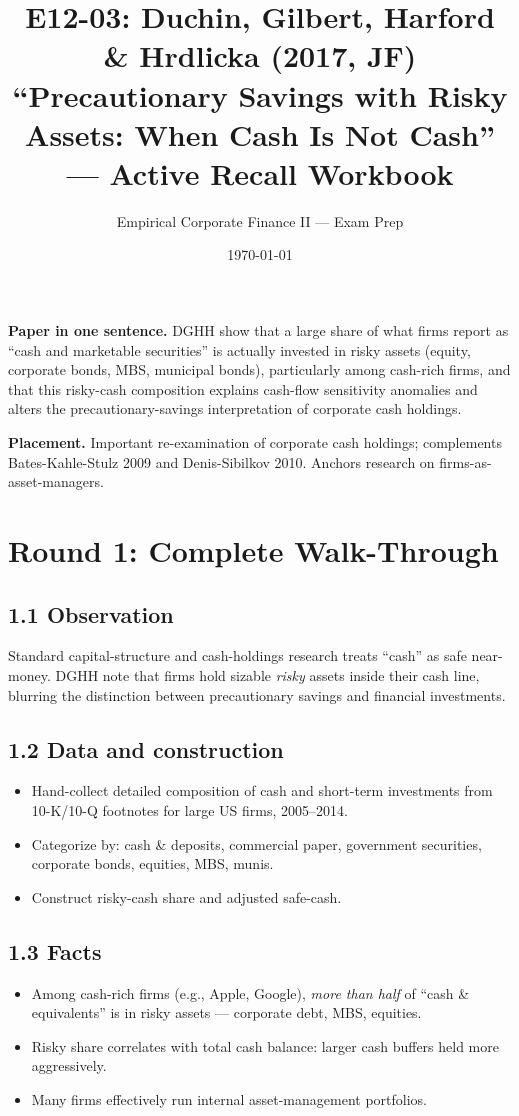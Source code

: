 \documentclass[11pt]{article}
\title{E12-03: Duchin, Gilbert, Harford \& Hrdlicka (2017, JF) \\
\large ``Precautionary Savings with Risky Assets: When Cash Is Not Cash'' --- Active Recall Workbook}
\author{Empirical Corporate Finance II --- Exam Prep}
\date{\today}
\begin{document}
\maketitle

\begin{keybox}
\textbf{Paper in one sentence.} DGHH show that a large share of what firms report as ``cash and marketable securities'' is actually invested in risky assets (equity, corporate bonds, MBS, municipal bonds), particularly among cash-rich firms, and that this risky-cash composition explains cash-flow sensitivity anomalies and alters the precautionary-savings interpretation of corporate cash holdings.

\textbf{Placement.} Important re-examination of corporate cash holdings; complements Bates-Kahle-Stulz 2009 and Denis-Sibilkov 2010. Anchors research on firms-as-asset-managers.
\end{keybox}

\section*{Round 1: Complete Walk-Through}

\subsection*{1.1 Observation}
Standard capital-structure and cash-holdings research treats ``cash'' as safe near-money. DGHH note that firms hold sizable \emph{risky} assets inside their cash line, blurring the distinction between precautionary savings and financial investments.

\subsection*{1.2 Data and construction}
\begin{itemize}
\item Hand-collect detailed composition of cash and short-term investments from 10-K/10-Q footnotes for large US firms, 2005--2014.
\item Categorize by: cash \& deposits, commercial paper, government securities, corporate bonds, equities, MBS, munis.
\item Construct risky-cash share and adjusted safe-cash.
\end{itemize}

\subsection*{1.3 Facts}
\begin{itemize}
\item Among cash-rich firms (e.g., Apple, Google), \emph{more than half} of ``cash \& equivalents'' is in risky assets --- corporate debt, MBS, equities.
\item Risky share correlates with total cash balance: larger cash buffers held more aggressively.
\item Many firms effectively run internal asset-management portfolios.
\end{itemize}
\end{document}
